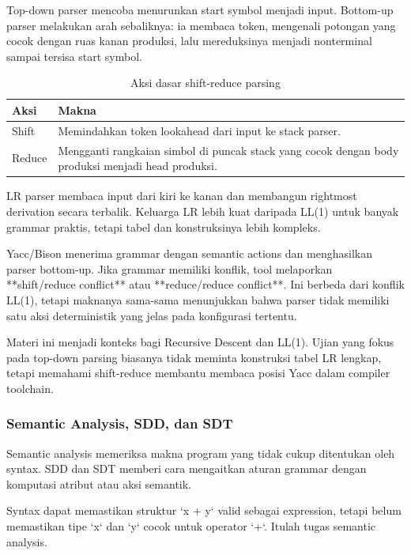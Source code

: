 Top-down parser mencoba menurunkan start symbol menjadi input. Bottom-up parser melakukan arah sebaliknya: ia membaca token, mengenali potongan yang cocok dengan ruas kanan produksi, lalu mereduksinya menjadi nonterminal sampai tersisa start symbol.

\begin{table}[H]
\centering
\begin{tabularx}{\textwidth}{|L{0.20\textwidth}|X|}
\hline
\textbf{Aksi} & \textbf{Makna} \\
\hline
Shift & Memindahkan token lookahead dari input ke stack parser. \\
\hline
Reduce & Mengganti rangkaian simbol di puncak stack yang cocok dengan body produksi menjadi head produksi. \\
\hline
\end{tabularx}
\caption{Aksi dasar shift-reduce parsing}
\label{tab:shift-reduce}
\end{table}

LR parser membaca input dari kiri ke kanan dan membangun rightmost derivation secara terbalik. Keluarga LR lebih kuat daripada LL(1) untuk banyak grammar praktis, tetapi tabel dan konstruksinya lebih kompleks.

Yacc/Bison menerima grammar dengan semantic actions dan menghasilkan parser bottom-up. Jika grammar memiliki konflik, tool melaporkan **shift/reduce conflict** atau **reduce/reduce conflict**. Ini berbeda dari konflik LL(1), tetapi maknanya sama-sama menunjukkan bahwa parser tidak memiliki satu aksi deterministik yang jelas pada konfigurasi tertentu.

Materi ini menjadi konteks bagi Recursive Descent dan LL(1). Ujian yang fokus pada top-down parsing biasanya tidak meminta konstruksi tabel LR lengkap, tetapi memahami shift-reduce membantu membaca posisi Yacc dalam compiler toolchain.

\subsubsection{Semantic Analysis, SDD, dan SDT}

\begin{jawab}
Semantic analysis memeriksa makna program yang tidak cukup ditentukan oleh syntax. SDD dan SDT memberi cara mengaitkan aturan grammar dengan komputasi atribut atau aksi semantik.
\end{jawab}

Syntax dapat memastikan struktur `x + y` valid sebagai expression, tetapi belum memastikan tipe `x` dan `y` cocok untuk operator `+`. Itulah tugas semantic analysis.

